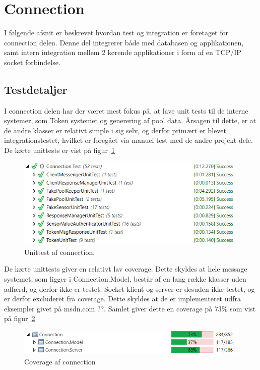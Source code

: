 \section{Connection}\label{sec:testconnection}
I følgende afsnit er beskrevet hvordan test og integration er foretaget for connection delen. Denne del integrerer både med databasen og applikationen, samt intern integration mellem 2 kørende applikationer i form af en TCP/IP socket forbindelse.

\subsection{Testdetaljer}
I connection delen har der været mest fokus på, at lave unit tests til de interne systemer, som Token systemet og generering af pool data. Årsagen til dette, er at de andre klasser er relativt simple i sig selv, og derfor primært er blevet integrationstestet, hvilket er foregået via manuel test med de andre projekt dele. De kørte unittests er vist på figur~\ref{fig:connectionunittest}

\begin{figure}[H]
	\centering
	\includegraphics[width=0.9\linewidth]{figs/connection/unittest.png}
	\caption{Unittest af connection.}
	\label{fig:connectionunittest}
\end{figure}

De kørte unittests giver en relativt lav coverage. Dette skyldes at hele message systemet, som ligger i Connection.Model, består af en lang række klasser uden adfærd, og derfor ikke er testet. Socket klient og server er desuden ikke testet, og er derfor excluderet fra coverage. Dette skyldes at de er implementeret udfra eksempler givet på msdn.com ??. Samlet giver dette en coverage på 73\% som vist på figur~\ref{fig:connectioncoverage}

\begin{figure}[H]
	\centering
	\includegraphics[width=0.9\linewidth]{figs/connection/coverage.png}
	\caption{Coverage af connection}
	\label{fig:connectioncoverage}
\end{figure}

